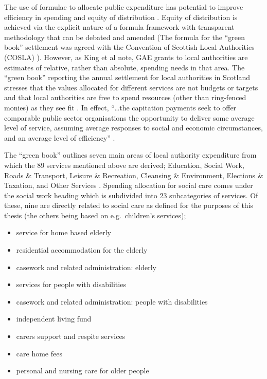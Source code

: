 \documentclass[12pt,]{report}
\begin{document}
The use of formulae to allocate public expenditure has potential to
improve efficiency in spending and equity of distribution \citep{RN444}.
Equity of distribution is achieved via the explicit nature of a formula
framework with transparent methodology that can be debated and amended
\citep{RN444} (The formula for the ``green book'' settlement was agreed
with the Convention of Scottish Local Authorities (COSLA)
\citep{RN448}). However, as King et al \citeyearpar{RN445} note, GAE
grants to local authorities are estimates of relative, rather than
absolute, spending needs in that area. The ``green book'' reporting the
annual settlement for local authorities in Scotland stresses that the
values allocated for different services are not budgets or targets and
that local authorities are free to spend resources (other than
ring-fenced monies) as they see fit \citep{RN450}. In effect,
``\ldots{}the capitation payments seek to offer comparable public sector
organisations the opportunity to deliver some average level of service,
assuming average responses to social and economic circumstances, and an
average level of efficiency'' \citep[pp.309]{RN444}.

The ``green book'' outlines seven main areas of local authority
expenditure from which the 89 services mentioned above are derived;
Education, Social Work, Roads \& Transport, Leisure \& Recreation,
Cleansing \& Environment, Elections \& Taxation, and Other Services
\citep{RN450}. Spending allocation for social care comes under the
social work heading which is subdivided into 23 subcategories of
services. Of these, nine are directly related to social care as defined
for the purposes of this thesis (the others being based on
e.g.~children's services);

\begin{itemize}[noitemsep]
\item service for home based elderly
\item residential accommodation for the elderly
\item casework and related administration: elderly
\item services for people with disabilities
\item casework and related administration: people with disabilities
\item independent living fund
\item carers support and respite services
\item care home fees
\item personal and nursing care for older people
\end{itemize}
\end{document}
